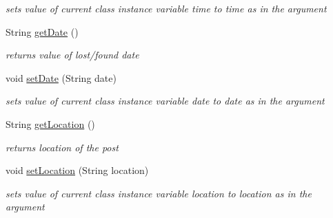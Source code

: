 \begin{DoxyCompactItemize}
\begin{DoxyCompactList}\small\item\em sets value of current class instance variable time to time as in the argument \end{DoxyCompactList}\item 
\hypertarget{classcom_1_1example_1_1sel_1_1lostfound_1_1UserPost_a6d959a32b2aaa20c3a501e60901214e6}{\-String \hyperlink{classcom_1_1example_1_1sel_1_1lostfound_1_1UserPost_a6d959a32b2aaa20c3a501e60901214e6}{get\-Date} ()}\label{classcom_1_1example_1_1sel_1_1lostfound_1_1UserPost_a6d959a32b2aaa20c3a501e60901214e6}

\begin{DoxyCompactList}\small\item\em returns value of lost/found date \end{DoxyCompactList}\item 
\hypertarget{classcom_1_1example_1_1sel_1_1lostfound_1_1UserPost_a617b2479a85c78119a7d59d046b6edc2}{void \hyperlink{classcom_1_1example_1_1sel_1_1lostfound_1_1UserPost_a617b2479a85c78119a7d59d046b6edc2}{set\-Date} (\-String date)}\label{classcom_1_1example_1_1sel_1_1lostfound_1_1UserPost_a617b2479a85c78119a7d59d046b6edc2}

\begin{DoxyCompactList}\small\item\em sets value of current class instance variable date to date as in the argument \end{DoxyCompactList}\item 
\hypertarget{classcom_1_1example_1_1sel_1_1lostfound_1_1UserPost_abc31b1e4f605f048c49e788daeee7a9b}{\-String \hyperlink{classcom_1_1example_1_1sel_1_1lostfound_1_1UserPost_abc31b1e4f605f048c49e788daeee7a9b}{get\-Location} ()}\label{classcom_1_1example_1_1sel_1_1lostfound_1_1UserPost_abc31b1e4f605f048c49e788daeee7a9b}

\begin{DoxyCompactList}\small\item\em returns location of the post \end{DoxyCompactList}\item 
\hypertarget{classcom_1_1example_1_1sel_1_1lostfound_1_1UserPost_adc028951513a63d36a2308ee2197117a}{void \hyperlink{classcom_1_1example_1_1sel_1_1lostfound_1_1UserPost_adc028951513a63d36a2308ee2197117a}{set\-Location} (\-String location)}\label{classcom_1_1example_1_1sel_1_1lostfound_1_1UserPost_adc028951513a63d36a2308ee2197117a}

\begin{DoxyCompactList}\small\item\em sets value of current class instance variable location to location as in the argument \end{DoxyCompactList}\end{DoxyCompactItemize}


